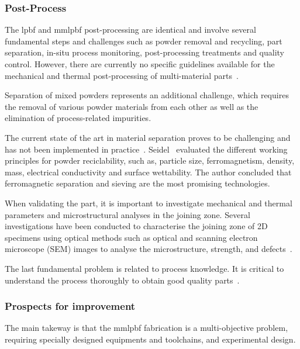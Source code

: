 \subsubsection{Post-Process}%
\label{sec:post-process}
The \gls{lpbf} and \gls{mmlpbf} post-processing are identical and involve
several fundamental steps and challenges such as powder removal and recycling, part
separation, in-situ process monitoring, post-processing treatments and quality
control. However, there are currently no specific guidelines available for the
mechanical and thermal post-processing of multi-material
parts~\cite{schneck2021review}.

Separation of mixed powders represents an additional challenge, which requires
the removal of various powder materials from each other as well as the
elimination of process-related impurities.

The current state of the art in
material separation proves to be challenging and has not been implemented in
practice~\cite{binder2018potentials, wei2021recent}.
Seidel~\cite{seidel2022multi} evaluated the different working principles for
powder reciclability, such as, particle size, ferromagnetism, density, mass,
electrical conductivity and surface wettability. The author concluded that
ferromagnetic separation and sieving are the most promising technologies.

When validating the part, it is important to investigate mechanical and thermal
parameters and microstructural analyses in the joining zone. Several
investigations have been conducted to characterise the joining zone of 2D
specimens using optical methods such as optical and scanning electron microscope
(SEM) images to analyse the microstructure, strength, and
defects~\cite{anstaett2017fabrication, wei2019additive, bartolomeu2020additive,
  marques2022RocketEngine, mao2022effects}.

The last fundamental problem is related to process knowledge. It is critical to
understand the process thoroughly to obtain good quality
parts~\cite{fayazfar2018critical,tey2020additive,wei2021understanding}.

\subsubsection{Prospects for improvement}%
\label{sec:prosp-impr-stateArt}
The main takeway is that the \gls{mmlpbf} fabrication is a multi-objective
problem, requiring specially designed equipments and toolchains, and
experimental design.

